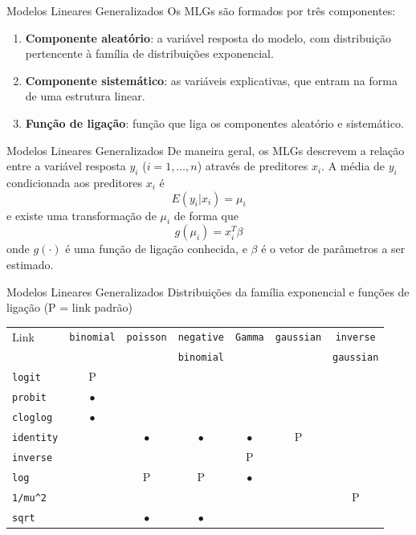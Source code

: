 \documentclass[10pt]{beamer}\usepackage{graphicx, color}
\begin{document}
\begin{frame}[fragile=singleslide]{Modelos Lineares Generalizados}
Os MLGs são formados por três componentes:
\begin{enumerate}
\item \textbf{Componente aleatório}: a variável resposta do modelo, com
  distribuição pertencente à família de distribuições exponencial.
\item \textbf{Componente sistemático}: as variáveis explicativas, que
  entram na forma de uma estrutura linear.
\item \textbf{Função de ligação}: função que liga os componentes
  aleatório e sistemático.
\end{enumerate}
\end{frame}

\begin{frame}[fragile=singleslide]{Modelos Lineares Generalizados}
De maneira geral, os MLGs descrevem a relação entre a variável resposta
$y_i$ ($i = 1, \ldots, n$) através de preditores $x_i$. A média de $y_i$
condicionada aos preditores $x_i$ é
\begin{equation*}
  E(y_i|x_i) = \mu_i
\end{equation*}
e existe uma transformação de $\mu_i$ de forma que
\begin{equation*}
  g(\mu_i) = x_{i}^{T}\beta
\end{equation*}
onde $g(\cdot)$ é uma função de ligação conhecida, e $\beta$ é o vetor
de parâmetros a ser estimado.
\end{frame}

\begin{frame}[fragile=singleslide]{Modelos Lineares Generalizados}
Distribuições da família exponencial e funções de ligação (P = link
padrão)
\begin{center}
\begin{table}[h!]
\renewcommand{\baselinestretch}{1}
\small\footnotesize\scriptsize
\begin{tabular}{lcccccc}
\hline
Link & \texttt{binomial} & \texttt{poisson} & \texttt{negative} &
\texttt{Gamma} & \texttt{gaussian} & \texttt{inverse}\\
    &       &    & \texttt{binomial} &  &  & \texttt{gaussian} \\
\hline
\texttt{logit} & P & & & & & \\
\texttt{probit} & $\bullet$ & & & & &  \\
\texttt{cloglog} & $\bullet$ & & & & &  \\
\texttt{identity} &  & $\bullet$ & $\bullet$ & $\bullet$ & P &  \\
\texttt{inverse} &  & & & P & &  \\
\texttt{log} &  & P & P & $\bullet$ & &  \\
\verb|1/mu^2| & & & & & & P  \\
\texttt{sqrt} & & $\bullet$ & $\bullet$ & & &  \\
\hline
\end{tabular}
\end{table}
\end{center}
\end{frame}
\end{document}
